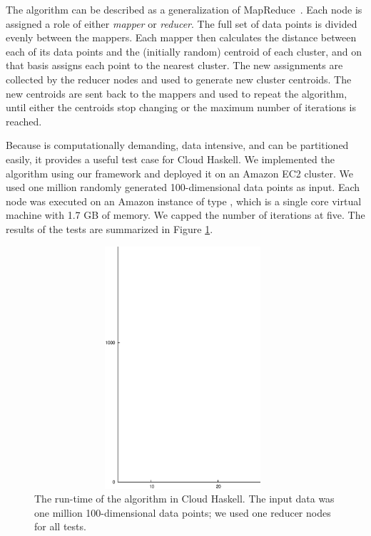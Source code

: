 \documentclass[preprint]{sigplanconf}
\begin{document}
The \kmeans{} algorithm can be described as a generalization of MapReduce~\cite{MapReduce2008}. Each node is assigned a role of either {\em mapper} or {\em reducer}. The full set of data points is divided evenly between the mappers. Each mapper then calculates the distance between each of its data points and the (initially random) centroid of each cluster, and on that basis assigns each point to the nearest cluster. The new assignments are collected by the reducer nodes and used to generate new cluster centroids. The new centroids are sent back to the mappers and used to repeat the algorithm, until either the centroids stop changing or the maximum number of iterations is reached.

Because \kmeans{} is computationally demanding, data intensive, and can be partitioned easily,  it provides a useful test case for Cloud Haskell. We implemented the \kmeans{} algorithm using our framework and deployed it on an Amazon EC2 cluster. We used one million randomly generated 100-dimensional data points as input. Each node was executed on an Amazon instance of type , which is a single core virtual machine with 1.7 GB of memory. We capped the number of iterations at five. The results of the tests are summarized in Figure \ref{fig:performance1}.

\begin{figure}[t]
\centerline {
 \includegraphics[height=9cm,width=11cm]{ec2}
}
\caption{ 
\label{fig:performance1}
The run-time of the \kmeans{} algorithm in Cloud Haskell. The input data was one million 100-dimensional data points; we used one reducer nodes for all tests. %
}
\end{figure}
\end{document}
